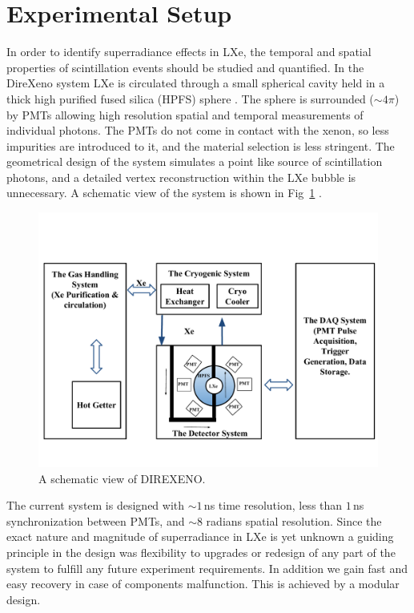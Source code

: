 \section{Experimental Setup}
\label{expSetup}


In order to identify superradiance effects in LXe, the temporal and spatial properties of scintillation events should be studied and quantified. In the DireXeno system LXe is circulated through a small spherical cavity held in a thick high purified fused silica (HPFS) sphere . The sphere is surrounded ($\sim4\pi$) by PMTs allowing high resolution spatial and temporal measurements of individual photons. The PMTs do not come in contact with the xenon, so less impurities are introduced to it, and the material selection is less stringent. The geometrical design of the system simulates a point like source of scintillation photons, and a detailed vertex reconstruction within the LXe bubble is unnecessary. A schematic view of the system is shown in Fig~\ref{fig:detSch} . 

\begin{figure}[h]
\centerline{\includegraphics[width=0.8\linewidth]{DetSch.pdf}}
\caption{A schematic view of DIREXENO.}
\label{fig:detSch}
\end{figure}


The current system is designed with  $\sim1$\,ns time resolution, less than $1$\,ns synchronization between PMTs, and $\sim8$ radians spatial resolution. Since the exact nature and magnitude of superradiance in LXe is yet unknown a guiding principle in the design was flexibility to upgrades or redesign of any part of the system to fulfill any future experiment requirements. In addition we gain fast and easy recovery in case of components malfunction. This is achieved by a modular design. 

